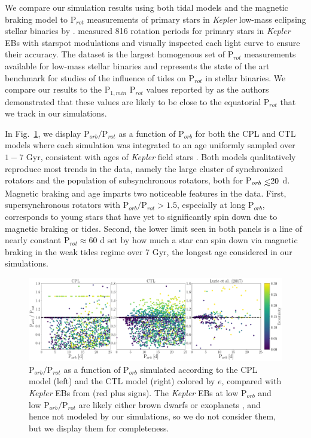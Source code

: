 \documentclass[twocolumn]{aastex61}
\def\lsim{~\rlap{$<$}{\lower 1.0ex\hbox{$\sim$}}}
\newcommand{\kepler}[0]{\textit{Kepler}\xspace}
\begin{document}
We compare our simulation results using both tidal models and the \citet{Matt2015} magnetic braking model to P$_{rot}$ measurements of primary stars in \kepler low-mass eclipsing stellar binaries by \citet{Lurie2017}.  \citet{Lurie2017} measured 816 rotation periods for primary stars in \kepler EBs with starspot modulations and visually inspected each light curve to ensure their accuracy. The \citet{Lurie2017} dataset is the largest homogenous set of P$_{rot}$ measurements available for low-mass stellar binaries and represents the state of the art benchmark for studies of the influence of tides on P$_{rot}$ in stellar binaries. We compare our results to the P$_{1,min}$ P$_{rot}$ values reported by \citet{Lurie2017} as the authors demonstrated that these values are likely to be close to the equatorial P$_{rot}$ that we track in our simulations.

In Fig.~\ref{fig:lurie7}, we display P$_{orb}/$P$_{rot}$ as a function of P$_{orb}$ for both the CPL and CTL models where each simulation was integrated to an age uniformly sampled over $1-7$ Gyr, consistent with ages of \kepler field stars \citep{Chaplin2014}.  Both models qualitatively reproduce most trends in the \citet{Lurie2017} data, namely the large cluster of synchronized rotators and the population of subsynchronous rotators, both for P$_{orb} \lsim 20$ d. Magnetic braking and age imparts two noticeable features in the data. First, supersynchronous rotators with P$_{orb}/$P$_{rot} > 1.5$, especially at long P$_{orb}$, corresponds to young stars that have yet to significantly spin down due to magnetic braking or tides.  Second, the lower limit seen in both panels is a line of nearly constant P$_{rot} \approx 60$ d set by how much a star can spin down via magnetic braking in the weak tides regime over 7 Gyr, the longest age considered in our simulations.  

\begin{figure}[t]
	\includegraphics[width=\textwidth]{../Plots/lurieFig7.pdf}
   \caption{P$_{orb}/$P$_{rot}$ as a function of P$_{orb}$ simulated according to the CPL model (left) and the CTL model (right) colored by $e$, compared with \kepler EBs from \citet{Lurie2017} (red plus signs).  The \kepler EBs at low P$_{orb}$ and low P$_{orb}/$P$_{rot}$ are likely either brown dwarfs or exoplanets \citep{Lurie2017}, and hence not modeled by our simulations, so we do not consider them, but we display them for completeness.}%
    \label{fig:lurie7}%
\end{figure}
\end{document}
